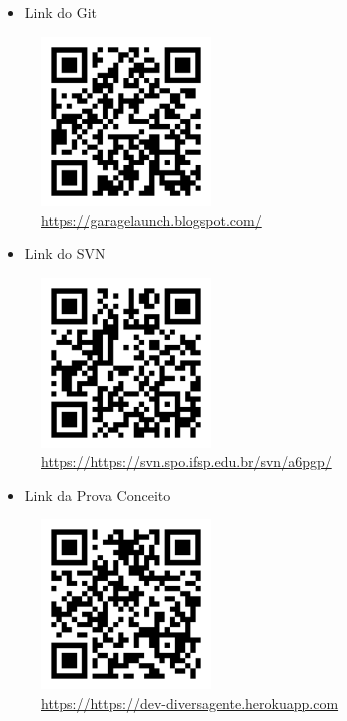 \begin{itemize}
	\item Link do Git
\end{itemize}
\begin{figure}[htb]
	\includegraphics[width=0.40\textwidth]{anexos/blog.png} \\
	\hyperlink {Link do Blog}{https://garagelaunch.blogspot.com/}
\end{figure}

\newline

\begin{itemize}
	\item Link do SVN
\end{itemize}
\begin{figure}[htb]
	\includegraphics[width=0.40\textwidth]{anexos/svn.png} \\
	\hyperlink {Link do Blog}{https://https://svn.spo.ifsp.edu.br/svn/a6pgp/}
\end{figure}

\pagebreak

\begin{itemize}
	\item Link da Prova Conceito
\end{itemize}
\begin{figure}[htb]
	\includegraphics[width=0.40\textwidth]{anexos/heroku.png} \\
	\hyperlink {Link do Blog}{https://https://dev-diversagente.herokuapp.com}
\end{figure}

